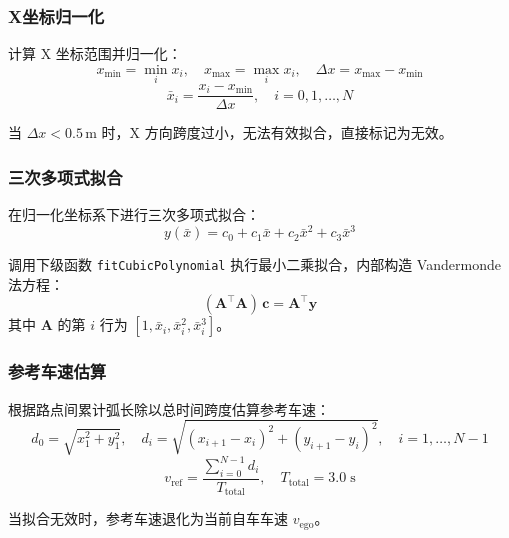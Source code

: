 \documentclass[a4paper,10pt]{article}
\begin{document}
\subsubsection{X坐标归一化}

计算 X 坐标范围并归一化：
\begin{equation}
  x_{\min} = \min_i x_i, \quad x_{\max} = \max_i x_i, \quad \Delta x = x_{\max} - x_{\min}
\end{equation}
\begin{equation}
  \bar{x}_i = \frac{x_i - x_{\min}}{\Delta x}, \quad i = 0, 1, \ldots, N
\end{equation}

当 $\Delta x < 0.5$\,m 时，X 方向跨度过小，无法有效拟合，直接标记为无效。

\subsubsection{三次多项式拟合}

在归一化坐标系下进行三次多项式拟合：
\begin{equation}
  y(\bar{x}) = c_0 + c_1 \bar{x} + c_2 \bar{x}^2 + c_3 \bar{x}^3
\end{equation}

调用下级函数 \texttt{fitCubicPolynomial} 执行最小二乘拟合，内部构造 Vandermonde 法方程：
\begin{equation}
  (\mathbf{A}^{\!\top}\!\mathbf{A})\,\mathbf{c} = \mathbf{A}^{\!\top}\!\mathbf{y}
\end{equation}
其中 $\mathbf{A}$ 的第 $i$ 行为 $[1, \bar{x}_i, \bar{x}_i^2, \bar{x}_i^3]$。

\subsubsection{参考车速估算}

根据路点间累计弧长除以总时间跨度估算参考车速：
\begin{equation}
  d_0 = \sqrt{x_1^2 + y_1^2}, \quad
  d_i = \sqrt{(x_{i+1} - x_i)^2 + (y_{i+1} - y_i)^2}, \quad i = 1,\ldots,N{-}1
\end{equation}
\begin{equation}
  v_{\text{ref}} = \frac{\sum_{i=0}^{N-1} d_i}{T_{\text{total}}}, \quad T_{\text{total}} = 3.0\;\text{s}
\end{equation}

当拟合无效时，参考车速退化为当前自车车速 $v_{\text{ego}}$。

\end{document}
